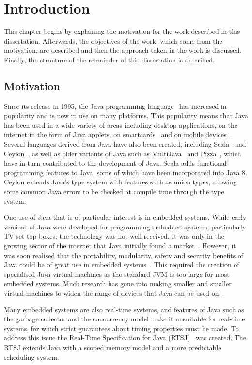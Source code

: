 
\chapter{Introduction}

This chapter begins by explaining the motivation for the work
described in this dissertation.
Afterwards, the objectives of the work, which come from the
motivation, are described and then the approach taken in the work is
discussed. 
Finally, the structure of the remainder of this dissertation is
described.

\section{Motivation}

Since its release in 1995, the Java programming
language~\cite{gosling2013} has increased in popularity and is now in
use on many platforms.
This popularity means that Java has been used in a wide variety of
areas including desktop applications, on the internet in the form of
Java applets, on smartcards~\cite{chen2000} and on mobile
devices~\cite{oracle2014}.
Several languages derived from Java have also been created, including
Scala~\cite{lausanne2015} and Ceylon~\cite{redhat2015}, as well as
older variants of Java such as MultiJava~\cite{clifton2006} and
Pizza~\cite{odersky1997}, which have in turn contributed to the
development of Java.
Scala adds functional programming features to Java, some of which have
been incorporated into Java 8.
Ceylon extends Java's type system with features such as union types,
allowing some common Java errors to be checked at compile time through
the type system.

One use of Java that is of particular interest is in embedded systems.
While early versions of Java were developed for programming embedded
systems, particularly TV set-top boxes, the technology was not well
received.
It was only in the growing sector of the internet that Java initially
found a market~\cite{horstmann2002}.
However, it was soon realised that the portability, modularity, safety
and security benefits of Java could be of great use in embedded
systems~\cite{mulchandani1998}.
This required the creation of specialised Java virtual machines as the
standard JVM is too large for most embedded systems.
Much research has gone into making smaller and smaller virtual
machines to widen the range of devices that Java can be used
on~\cite{caska2011,thomm2010}.

Many embedded systems are also real-time systems, and features of Java
such as the garbage collector and the concurrency model make it
unsuitable for real-time systems, for which strict guarantees about
timing properties must be made.
To address this issue the Real-Time Specification for Java
(RTSJ)~\cite{gosling2000} was created.
The RTSJ extends Java with a scoped memory model and a more
predictable scheduling system.

